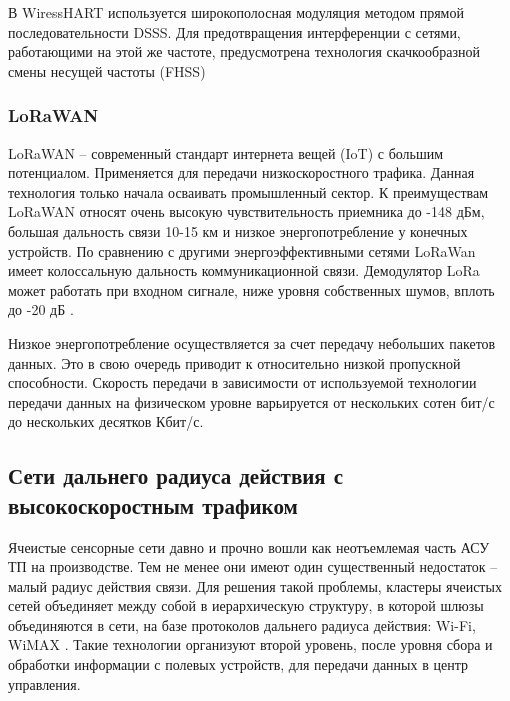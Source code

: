В WiressHART используется широкополосная модуляция методом прямой последовательности DSSS. Для предотвращения интерференции с сетями, работающими на этой же частоте, предусмотрена технология скачкообразной смены несущей частоты (FHSS) \cite{Tagirov2013}

\subsubsection{LoRaWAN}
LoRaWAN -- современный стандарт интернета вещей (IoT) с большим потенциалом. Применяется для передачи низкоскоростного трафика. Данная технология только начала осваивать промышленный сектор. К преимуществам LoRaWAN относят очень высокую чувствительность приемника до -148 дБм, большая дальность связи 10-15 км и низкое энергопотребление у конечных устройств. По сравнению с другими энергоэффективными сетями LoRaWan имеет колоссальную дальность коммуникационной связи. Демодулятор LoRa может работать при входном сигнале, ниже уровня собственных шумов, вплоть до -20 дБ \cite{Yang2020}. 

Низкое энергопотребление осуществляется за счет передачу небольших пакетов данных. Это в свою очередь приводит к относительно низкой пропускной способности. Скорость передачи в зависимости от используемой технологии передачи данных на физическом уровне варьируется от нескольких сотен бит/с до нескольких десятков Кбит/с.





\subsection{Сети дальнего радиуса действия с высокоскоростным трафиком}

Ячеистые сенсорные сети давно и прочно вошли как неотъемлемая часть АСУ ТП на производстве. Тем не менее они имеют один существенный недостаток -- малый радиус действия связи. Для решения такой проблемы, кластеры ячеистых сетей объединяет между собой в иерархическую структуру, в которой шлюзы объединяются в сети, на базе протоколов дальнего радиуса действия: Wi-Fi, WiMAX \cite{Savazzi2013}. Такие технологии организуют второй уровень, после уровня сбора и обработки информации с полевых устройств, для передачи данных в центр управления.







